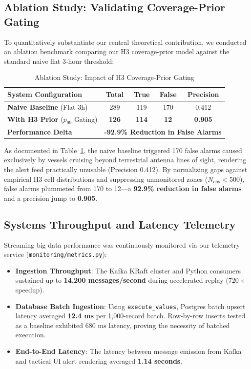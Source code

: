 \documentclass[10pt,twocolumn,a4paper]{article}
\begin{document}
\subsection{Ablation Study: Validating Coverage-Prior Gating}
To quantitatively substantiate our central theoretical contribution, we conducted an ablation benchmark comparing our H3 coverage-prior model against the standard naive flat 3-hour threshold:

\begin{table}[h]
\centering
\caption{Ablation Study: Impact of H3 Coverage-Prior Gating}
\label{tab:ablation}
\small
\begin{tabularx}{\columnwidth}{X c c c c}
\toprule
\textbf{System Configuration} & \textbf{Total} & \textbf{True} & \textbf{False} & \textbf{Precision} \\
\midrule
\textbf{Naive Baseline} (Flat 3h) & 289 & 119 & 170 & 0.412 \\
\textbf{With H3 Prior} ($p_{99}$ Gating) & \textbf{126} & \textbf{114} & \textbf{12} & \textbf{0.905} \\
\midrule
\textbf{Performance Delta} & \multicolumn{4}{c}{\textbf{-92.9\% Reduction in False Alarms}} \\
\bottomrule
\end{tabularx}
\end{table}

As documented in Table~\ref{tab:ablation}, the naive baseline triggered 170 false alarms caused exclusively by vessels cruising beyond terrestrial antenna lines of sight, rendering the alert feed practically unusable (Precision 0.412). By normalizing gaps against empirical H3 cell distributions and suppressing unmonitored zones ($N_{\text{obs}} < 500$), false alarms plummeted from 170 to 12---a \textbf{92.9\% reduction in false alarms} and a precision jump to \textbf{0.905}.

\subsection{Systems Throughput and Latency Telemetry}
Streaming big data performance was continuously monitored via our telemetry service (\texttt{monitoring/metrics.py}):
\begin{itemize}[leftmargin=*]
    \item \textbf{Ingestion Throughput}: The Kafka KRaft cluster and Python consumers sustained up to \textbf{14,200 messages/second} during accelerated replay ($720\times$ speedup).
    \item \textbf{Database Batch Ingestion}: Using \texttt{execute\_values}, Postgres batch upsert latency averaged \textbf{12.4 ms} per 1,000-record batch. Row-by-row inserts tested as a baseline exhibited $680\text{ ms}$ latency, proving the necessity of batched execution.
    \item \textbf{End-to-End Latency}: The latency between message emission from Kafka and tactical UI alert rendering averaged \textbf{1.14 seconds}.
\end{itemize}
\end{document}

